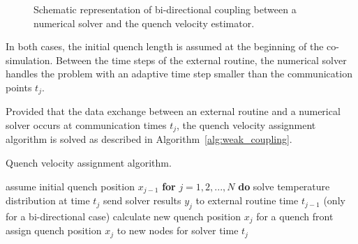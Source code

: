 \begin{figure}[H]
\centering
{}
\caption{Schematic representation of bi-directional coupling between a numerical solver and the quench velocity estimator.}
\label{fig:bidirectional_coupling_scheme}
\end{figure}

In both cases, the initial quench length is assumed at the beginning of the co-simulation. Between the time steps of the external routine, the numerical solver handles the problem with an adaptive time step smaller than the communication points $t_j$.

Provided that the data exchange between an external routine and a numerical solver occurs at communication times $t_j$, the quench velocity assignment algorithm is solved as described in Algorithm~\ref{alg:weak_coupling}.

\begin{algorithm}[H]
  \caption{Quench velocity assignment algorithm.}
  \label{alg:weak_coupling}
  \begin{algorithmic}[1]
    \STATE assume initial quench position $x_{j-1}$ 
    \STATE \textbf{for} $j=1,2,...,N$ \textbf{do}
    \STATE \hspace{0.5cm} solve temperature distribution at time $t_j$
    \STATE \hspace{0.5cm} send solver results $y_{j}$ to external routine time $t_{j-1}$ (only for a bi-directional case)
    \STATE \hspace{0.5cm} calculate new quench position $x_{j}$ for a quench front
    \STATE \hspace{0.5cm} assign quench position $x_{j}$ to new nodes for solver time  $t_j$
  \end{algorithmic}
\end{algorithm}


